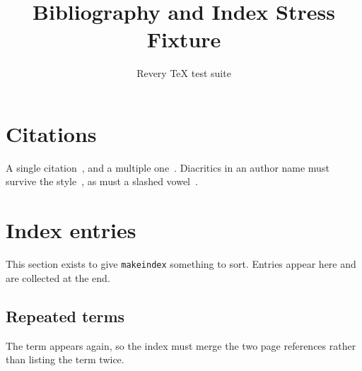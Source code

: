 \documentclass[11pt]{article}
\title{Bibliography and Index Stress Fixture}
\author{Revery TeX test suite}
\begin{document}
\maketitle

\section{Citations}
\label{sec:citations}

A single citation~\cite{knuth1984}, and a multiple one~\cite{lamport1994,mittelbach2004}.
Diacritics in an author name must survive the style~\cite{unicodecite2020}, as must a
slashed vowel~\cite{report2019}.


\section{Index entries}
\label{sec:index}

This section exists to give \texttt{makeindex} something to sort.
Entries appear here and are collected at the end.

\subsection{Repeated terms}
The term appears again, so the index must merge the two page
references rather than listing the term twice.

\printbibliography
\printindex
\end{document}
